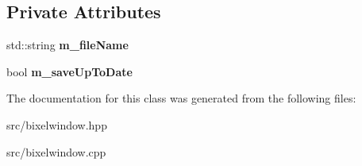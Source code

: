 \subsection*{Private Attributes}
\begin{DoxyCompactItemize}
\item 
\hypertarget{classBixelWindow_a79a31382419d315ab1dfb86d421afd78}{std\-::string {\bfseries m\-\_\-file\-Name}}\label{classBixelWindow_a79a31382419d315ab1dfb86d421afd78}

\item 
\hypertarget{classBixelWindow_aa8803890cb2c415870bd3d74834a266d}{bool {\bfseries m\-\_\-save\-Up\-To\-Date}}\label{classBixelWindow_aa8803890cb2c415870bd3d74834a266d}

\end{DoxyCompactItemize}


The documentation for this class was generated from the following files\-:\begin{DoxyCompactItemize}
\item 
src/bixelwindow.\-hpp\item 
src/bixelwindow.\-cpp\end{DoxyCompactItemize}
